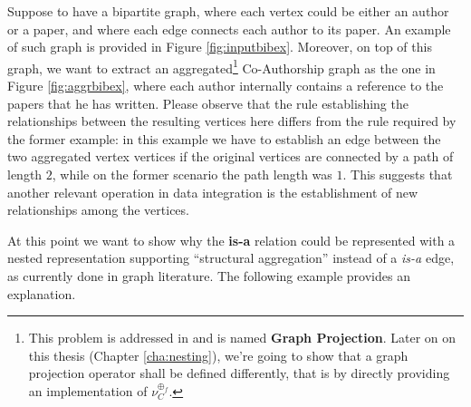 \begin{example}\label{ex:bigraphbibnet}
Suppose to have a bipartite graph, where each vertex could be either an author or a paper, and where each edge connects each author to its paper. An example of such graph is provided in Figure \vref{fig:inputbibex}. Moreover, on top of this graph, we want to extract an aggregated\footnote{This problem is addressed in \cite{DMR} and is named \textbf{Graph Projection}. Later on on this thesis (Chapter \ref{cha:nesting}), we're going to show that a graph projection operator shall be defined differently, that is by directly providing an implementation of $\nu_C^{\oplus_f}$.} Co-Authorship graph as the one in Figure \ref{fig:aggrbibex}, where each author internally contains a reference to the papers that he has written. Please observe that the rule establishing the relationships between the resulting vertices here differs from the rule required by the former example: in this example we have to establish an edge between the two aggregated vertex vertices if the original vertices are connected by a path of length $2$, while on the former scenario the path length was $1$. This suggests that another relevant operation in data integration is the establishment of new relationships among the vertices. %
\end{example}

At this point we want to show why the \textbf{is-a} relation could be represented with a nested representation supporting ``structural aggregation'' instead of a \textit{is-a} edge, as currently done in  graph literature. The following example provides an explanation.


